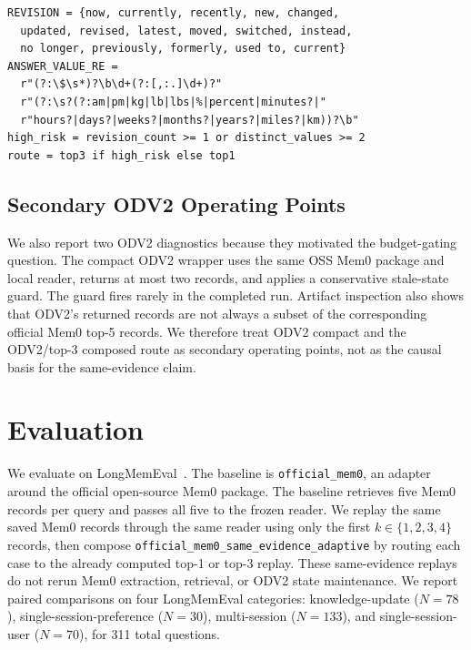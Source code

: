 \documentclass{article}
\begin{document}
\begingroup
\footnotesize
\begin{verbatim}
REVISION = {now, currently, recently, new, changed,
  updated, revised, latest, moved, switched, instead,
  no longer, previously, formerly, used to, current}
ANSWER_VALUE_RE =
  r"(?:\$\s*)?\b\d+(?:[,:.]\d+)?"
  r"(?:\s?(?:am|pm|kg|lb|lbs|%|percent|minutes?|"
  r"hours?|days?|weeks?|months?|years?|miles?|km))?\b"
high_risk = revision_count >= 1 or distinct_values >= 2
route = top3 if high_risk else top1
\end{verbatim}
\endgroup

\subsection{Secondary ODV2 Operating Points}

We also report two ODV2 diagnostics because they motivated the budget-gating question. The compact ODV2 wrapper uses the same OSS Mem0 package and local reader, returns at most two records, and applies a conservative stale-state guard. The guard fires rarely in the completed run. Artifact inspection also shows that ODV2's returned records are not always a subset of the corresponding official Mem0 top-5 records. We therefore treat ODV2 compact and the ODV2/top-3 composed route as secondary operating points, not as the causal basis for the same-evidence claim.

\section{Evaluation}

We evaluate on LongMemEval~\cite{wu2025longmemeval}. The baseline is \texttt{official\_mem0}, an adapter around the official open-source Mem0 package. The baseline retrieves five Mem0 records per query and passes all five to the frozen reader. We replay the same saved Mem0 records through the same reader using only the first $k \in \{1,2,3,4\}$ records, then compose \texttt{official\_mem0\_same\_evidence\_adaptive} by routing each case to the already computed top-1 or top-3 replay. These same-evidence replays do not rerun Mem0 extraction, retrieval, or ODV2 state maintenance. We report paired comparisons on four LongMemEval categories: knowledge-update ($N=78$), single-session-preference ($N=30$), multi-session ($N=133$), and single-session-user ($N=70$), for 311 total questions.
\end{document}
